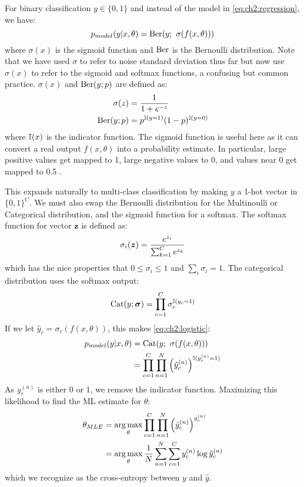 For binary classification $y \in \{0, 1\}$ and instead of the model in
\eqref{eq:ch2:regression}, we have:
\begin{equation} \label{eq:ch2:logistic}
  p_{model}(y|x, \theta) = \mathrm{Ber}(y;\ \sigma(f(x, \theta)))
\end{equation}
where $\sigma(x)$ is the sigmoid function and $\mathrm{Ber}$ is the Bernoulli
distribution. Note that we have used $\sigma$ to refer to noise standard
deviation thus far but now use $\sigma(x)$ to refer to the sigmoid and softmax
functions, a confusing but common practice. $\sigma(x)$ and
$\mathrm{Ber}(y; p)$ are defined as:
\begin{align}
  \sigma(z) &= \frac{1}{1+e^{-z}} \label{eq:ch2:sigmoid} \\
  \mathrm{Ber}(y; p) &= p^{\mathbb{I}(y=1)}(1-p)^{\mathbb{I}(y=0)}
\end{align}
where $\mathbb{I}(x)$ is the indicator function. The sigmoid function is useful here
as it can convert a real output $f(x, \theta)$ into a probability estimate.
In particular, large positive values get mapped to 1, large negative values to
0, and values near 0 get mapped to 0.5 \cite[Chapter~6]{goodfellow_deep_2016}.

This expands naturally to multi-class classification by making $y$ a 1-hot
vector in $\{0, 1\}^C$. We must also
swap the Bernoulli distribution for the Multinoulli or Categorical distribution,
and the sigmoid function for a softmax. The softmax function for vector $\bm{z}$
is defined as:
\begin{equation}
  \sigma_i(\bm{z}) = \frac{e^{z_i}}{\sum_{k=1}^C e^{z_k}} \\
\end{equation}
which has the nice properties that $0 \leq \sigma_i \leq 1$ and $\sum_i \sigma_i = 1$. The categorical
distribution uses the softmax output:
\begin{equation}
  \mathrm{Cat}(y; \bm{\sigma}) = \prod_{c=1}^C \sigma_c^{\mathbb{I}(y_c = 1)}
\end{equation}
If we let $\hat{y}_c = \sigma_c(f(x, \theta))$, this makes \eqref{eq:ch2:logistic}:
\begin{align}\label{eq:ch2:classification}
  p_{model}(y|x, \theta) &= \mathrm{Cat}(y;\ \sigma(f(x, \theta))) \\
                         &= \prod_{c=1}^C \prod_{n=1}^N \left(\hat{y}_c^{(n)}\right)^{\mathbb{I}(y^{(n)}_c = 1)}
\end{align}
As $y^{(n)}_c$ is either 0 or
1, we remove the indicator function. Maximizing this likelihood to
find the ML estimate for $\theta$:
\begin{align}
  \theta_{MLE} &= \operatorname*{arg\,max}_\theta \prod_{c=1}^C \prod_{n=1}^N \left(\hat{y}_c^{(n)}\right)^{y^{(n)}_c} \\
               &= \operatorname*{arg\,max}_\theta \frac{1}{N}\sum_{n=1}^N \sum_{c=1}^C y^{(n)}_c\log \hat{y}_c^{(n)} \label{eq:ch2:mle_class}
\end{align}
which we recognize as the cross-entropy between $y$ and $\hat{y}$.

